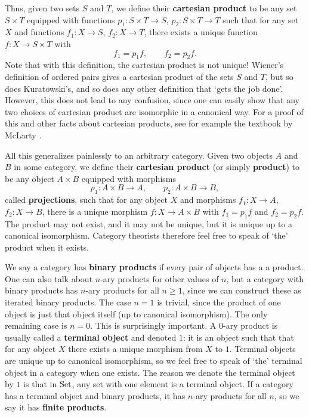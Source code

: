 \documentclass[12pt]{article}
\newcommand{\Set}{{\rm Set}}
\renewcommand{\to}{\rightarrow}
\newcommand{\maps}{\colon}
\begin{document}
Thus, given two sets $S$ and $T$, we define their {\bf 
cartesian product} to be any set $S \times T$ equipped with 
functions $p_1 \maps S \times T \to S$, $p_2 \maps S \times T \to T$
such that for any set $X$ and functions $f_1 \maps X \to S$, 
$f_2 \maps X \to T$, there exists a unique function 
$f \maps X \to S \times T$ with 
\[        f_1 = p_1 f, \qquad  f_2 = p_2 f.  \]
Note that with this definition, the cartesian product is not unique!
Wiener's definition of ordered pairs gives a cartesian product of the
sets $S$ and $T$, but so does Kuratowski's, and so does any
other definition that `gets the job done'.  However, this does not
lead to any confusion, since one can easily show that any two choices
of cartesian product are isomorphic in a canonical way.  For a proof
of this and other facts about cartesian products, see for example the
textbook by McLarty \cite{McLarty}.

All this generalizes painlessly to an arbitrary category.
Given two objects $A$ and $B$ in some category, 
we define their {\bf cartesian product} (or simply {\bf product})
to be any object $A \times B$ equipped with morphisms 
\[          p_1 \maps A \times B \to A, \qquad
          p_2 \maps A \times B \to B,  \]
called {\bf projections}, such that for any object $X$ and morphisms
$f_1 \maps X \to A$, $f_2 \maps X \to B$, there is a unique morphism
$f \maps X \to A \times B$ with $f_1 = p_1 f$ and $f_2 = p_2 f$.  The
product may not exist, and it may not be unique, but it is unique up
to a canonical isomorphism.  Category theorists therefore feel free to
speak of `the' product when it exists.

We say a category has {\bf binary products} if every pair of objects
has a a product.  One can also talk about $n$-ary products for other
values of $n$, but a category with binary products has $n$-ary
products for all $n \ge 1$, since we can construct these as iterated
binary products.  The case $n = 1$ is trivial, since the product of
one object is just that object itself (up to canonical isomorphism).
The only remaining case is $n = 0$.  This is surprisingly important.
A $0$-ary product is usually called a {\bf terminal object} and
denoted $1$: it is an object such that that for any object $X$ there
exists a unique morphism from $X$ to $1$.  Terminal objects are unique
up to canonical isomorphism, so we feel free to speak of `the'
terminal object in a category when one exists.  The reason we denote
the terminal object by $1$ is that in $\Set$, any set with one element
is a terminal object.  If a category has a terminal object and binary
products, it has $n$-ary products for all $n$, so we say it has {\bf
finite products}.
\end{document}
